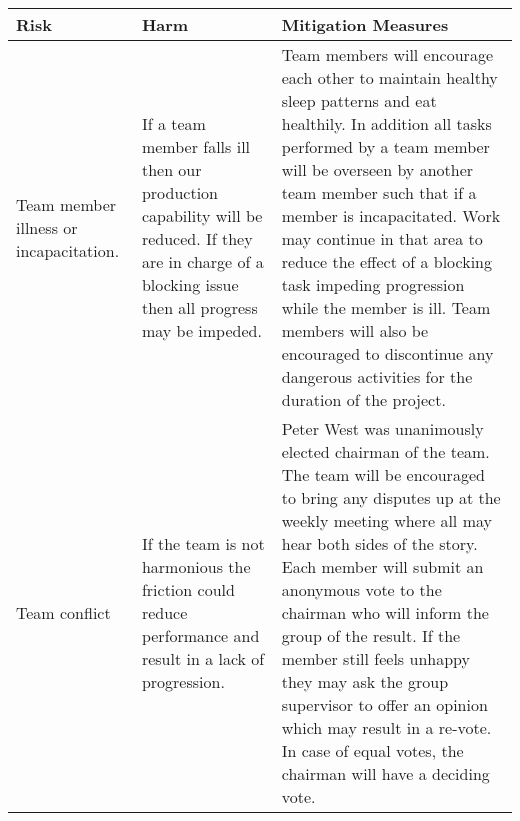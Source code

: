 \newpage
\begin{center}
\begin{landscape}
    \begin{longtable}{|p{3cm}|p{7cm}|p{12cm}|}
        \hline
\textbf{Risk} & \textbf{Harm} & \textbf{Mitigation Measures}
\\ \hline
        Team member illness or incapacitation.           & If a team member falls ill then our production capability will be reduced. If they are in charge of a blocking issue then all progress may be impeded.                                                                                                                                                                                                                       & Team members will encourage each other to maintain healthy sleep patterns and eat healthily. In addition all tasks performed by a team member will be overseen by another team member such that if a member is incapacitated. Work may continue in that area to reduce the effect of a blocking task impeding progression while the member is ill. Team members will also be encouraged to discontinue any dangerous activities for the duration of the project.                                                                                                                                                                                                                                                                                                                                                                                                                                                                                                                                                                         \\ \hline
        Team conflict                                    & If the team is not harmonious the friction could reduce performance and result in a lack of progression.                                                                                                                                                                                                                                                                     & Peter West was unanimously elected chairman of the team. The team will be encouraged to bring any disputes up at the weekly meeting where all may hear both sides of the story. Each member will submit an anonymous vote to the chairman who will inform the group of the result. If the member still feels unhappy they may ask the group supervisor to offer an opinion which may result in a re-vote. In case of equal votes, the chairman will have a deciding vote.                                                                                                                                                                                                                                                                                                                                                                                                                                                                                                                                                                \\ \hline

\end{longtable}
\end{landscape}
\end{center}
